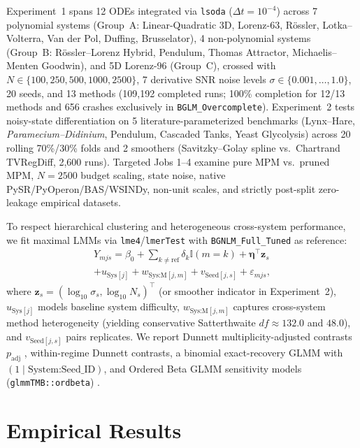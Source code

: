 \documentclass{article}
\begin{document}
Experiment~1 spans 12 ODEs integrated via \texttt{lsoda} ($\Delta t = 10^{-4}$) across 7 polynomial systems (Group~A: Linear-Quadratic 3D, Lorenz-63, R\"ossler, Lotka--Volterra, Van der Pol, Duffing, Brusselator), 4 non-polynomial systems (Group~B: R\"ossler--Lorenz Hybrid, Pendulum, Thomas Attractor, Michaelis--Menten Goodwin), and 5D Lorenz-96 (Group~C), crossed with $N \in \{100, 250, 500, 1000, 2500\}$, 7 derivative SNR noise levels $\sigma \in \{0.001, \dots, 1.0\}$, 20 seeds, and 13 methods (109,192 completed runs; 100\% completion for 12/13 methods and 656 crashes exclusively in \texttt{BGLM\_Overcomplete}). Experiment~2 tests noisy-state differentiation on 5 literature-parameterized benchmarks (Lynx--Hare, \emph{Paramecium--Didinium}, Pendulum, Cascaded Tanks, Yeast Glycolysis) across 20 rolling 70\%/30\% folds and 2 smoothers (Savitzky--Golay spline vs.\ Chartrand TVRegDiff, 2,600 runs). Targeted Jobs 1--4 examine pure MPM vs.\ pruned MPM, $N=2500$ budget scaling, state noise, native PySR/PyOperon/BAS/WSINDy, non-unit scales, and strictly post-split zero-leakage empirical datasets.

To respect hierarchical clustering and heterogeneous cross-system performance, we fit maximal LMMs via \texttt{lme4}/\texttt{lmerTest} \citep{bates2015fitting,kuznetsova2017lmertest} with \texttt{BGNLM\_Full\_Tuned} as reference:
\begin{multline}
  Y_{mjs} = \beta_0 + \sum_{k \neq \text{ref}} \delta_k \mathbb{I}(m=k) + \boldsymbol{\eta}^\top \boldsymbol{z}_s \\
  + u_{\text{Sys}[j]} + w_{\text{Sys:M}[j,m]} + v_{\text{Seed}[j,s]} + \varepsilon_{mjs},
\end{multline}
where $\boldsymbol{z}_s = (\log_{10}\sigma_s, \log_{10}N_s)^\top$ (or smoother indicator in Experiment~2), $u_{\text{Sys}[j]}$ models baseline system difficulty, $w_{\text{Sys:M}[j,m]}$ captures cross-system method heterogeneity (yielding conservative Satterthwaite $df \approx 132.0$ and $48.0$), and $v_{\text{Seed}[j,s]}$ pairs replicates. We report Dunnett multiplicity-adjusted contrasts $p_{\text{adj}}$ \citep{dunnett1955multiple,lenth2024emmeans}, within-regime Dunnett contrasts, a binomial exact-recovery GLMM with $(1\mid\text{System:Seed\_ID})$, and Ordered Beta GLMM sensitivity models (\texttt{glmmTMB::ordbeta}) \citep{brooks2017glmmtmb,kubinec2023ordered}.

\section{Empirical Results}
\end{document}
